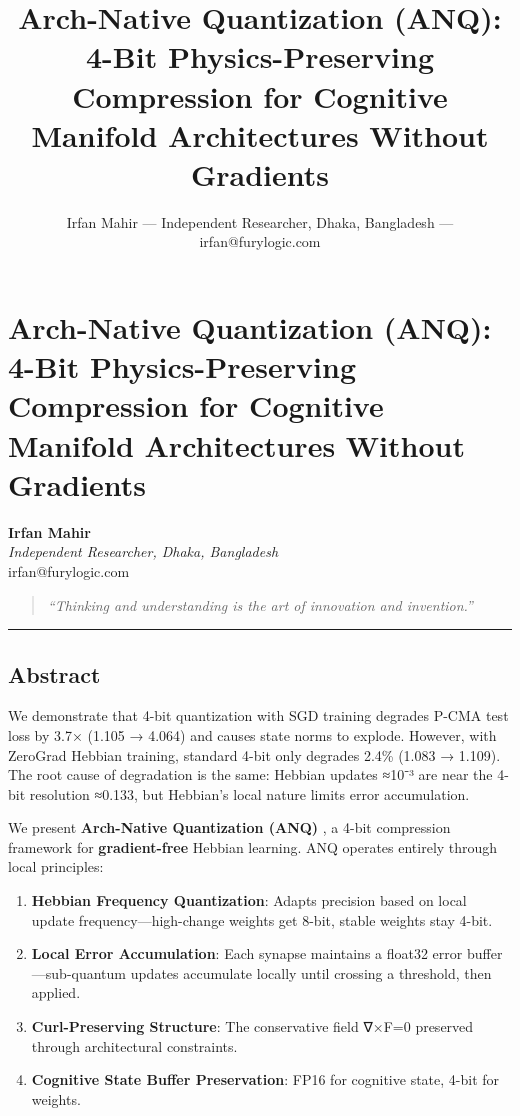 \documentclass[
  11pt,
  a4paper,
]{article}
\title{Arch-Native Quantization (ANQ): 4-Bit Physics-Preserving
Compression for Cognitive Manifold Architectures Without Gradients}
\author{Irfan Mahir --- Independent Researcher, Dhaka, Bangladesh ---
irfan@furylogic.com}
\date{}
\begin{document}
\maketitle

{
\hypersetup{linkcolor=}
\setcounter{tocdepth}{3}
\tableofcontents
}
\section{Arch-Native Quantization (ANQ): 4-Bit Physics-Preserving
Compression for Cognitive Manifold Architectures Without
Gradients}\label{arch-native-quantization-anq-4-bit-physics-preserving-compression-for-cognitive-manifold-architectures-without-gradients}

\textbf{Irfan Mahir}\\
\emph{Independent Researcher, Dhaka, Bangladesh}\\
irfan@furylogic.com

\begin{quote}
\emph{``Thinking and understanding is the art of innovation and
invention.''}
\end{quote}

\begin{center}\rule{0.5\linewidth}{0.5pt}\end{center}

\subsection{Abstract}\label{abstract}

We demonstrate that 4-bit quantization with SGD training degrades P-CMA
test loss by 3.7× (1.105 → 4.064) and causes state norms to explode.
However, with ZeroGrad Hebbian training, standard 4-bit only degrades
2.4\% (1.083 → 1.109). The root cause of degradation is the same:
Hebbian updates ≈10⁻³ are near the 4-bit resolution ≈0.133, but
Hebbian's local nature limits error accumulation.

We present \textbf{Arch-Native Quantization (ANQ)} , a 4-bit compression
framework for \textbf{gradient-free} Hebbian learning. ANQ operates
entirely through local principles:

\begin{enumerate}
\def\labelenumi{\arabic{enumi}.}
\item
  \textbf{Hebbian Frequency Quantization}: Adapts precision based on
  local update frequency---high-change weights get 8-bit, stable weights
  stay 4-bit.
\item
  \textbf{Local Error Accumulation}: Each synapse maintains a float32
  error buffer---sub-quantum updates accumulate locally until crossing a
  threshold, then applied.
\item
  \textbf{Curl-Preserving Structure}: The conservative field ∇×F=0
  preserved through architectural constraints.
\item
  \textbf{Cognitive State Buffer Preservation}: FP16 for cognitive
  state, 4-bit for weights.
\end{enumerate}
\end{document}
